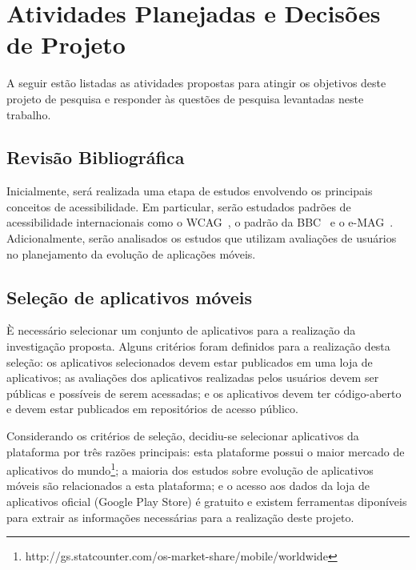 
\section{Atividades Planejadas e Decisões de Projeto}
\label{sec:atividadesgerais}

A seguir estão listadas as atividades propostas para atingir os objetivos deste projeto de pesquisa e responder às questões de pesquisa levantadas neste trabalho.

\subsection{Revisão Bibliográfica}

Inicialmente, será realizada uma etapa de estudos envolvendo os principais conceitos de acessibilidade. Em particular, serão estudados padrões de acessibilidade internacionais como o WCAG~\cite{wcag}, o padrão da BBC~\cite{bbc} e o e-MAG~\cite{emag}. Adicionalmente, serão analisados os estudos que utilizam avaliações de usuários no planejamento da evolução de aplicações móveis.

\subsection{Seleção de aplicativos móveis}
\label{sec:selecaoapps}

È necessário selecionar um conjunto de aplicativos para a realização da investigação proposta. Alguns critérios foram definidos para a realização desta seleção: os aplicativos selecionados devem estar publicados em uma loja de aplicativos; as avaliações dos aplicativos realizadas pelos usuários devem ser públicas e possíveis de serem acessadas; e os aplicativos devem ter código-aberto e devem estar publicados em repositórios de acesso público.

Considerando os critérios de seleção, decidiu-se selecionar aplicativos da plataforma por três razões principais: 
esta plataforme possui o maior mercado de aplicativos do mundo\footnote{http://gs.statcounter.com/os-market-share/mobile/worldwide}; 
a maioria dos estudos sobre evolução de aplicativos móveis são relacionados a esta plataforma; 
e o acesso aos dados da loja de aplicativos oficial (Google Play Store) é gratuito e existem ferramentas diponíveis para extrair as informações necessárias para a realização deste projeto. 

